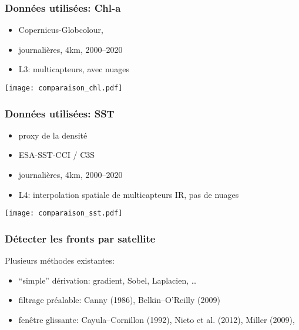\documentclass[11pt, french, aspectratio=32]{beamer}
\begin{document}

\begin{frame}
  \frametitle{Données utilisées: Chl-a}

  \begin{block}{}
    \begin{itemize}
      \item Copernicus-Globcolour,
      \item journalières, 4km, 2000--2020
      \item L3: multicapteurs, avec nuages
    \end{itemize}
  \end{block}

  \vfill

  {\footnotesize\textit{\raisebox{2em}{22 avril 2007}}}
  \texttt{[image: comparaison\_chl.pdf]}%
\end{frame}


\begin{frame}
  \frametitle{Données utilisées: SST}

  \begin{block}{}
    \begin{itemize}
      \item proxy de la densité
      \item ESA-SST-CCI / C3S
      \item journalières, 4km, 2000--2020
      \item L4: interpolation spatiale de multicapteurs IR, pas de nuages
    \end{itemize}
  \end{block}

  \vfill

  {\footnotesize\textit{\raisebox{2em}{22 avril 2007}}}
  \texttt{[image: comparaison\_sst.pdf]}%

\end{frame}


\begin{frame}
  \frametitle{Détecter les fronts par satellite}

  \begin{block}{}
    Plusieurs méthodes existantes:
    \begin{itemize}
            \setlength{\itemsep}{1.2em}
      \item “simple” dérivation: gradient, Sobel, Laplacien, \dots
      \item filtrage préalable: Canny (1986), Belkin--O'Reilly (2009)
      \item fenêtre glissante: Cayula--Cornillon (1992), Nieto et al. (2012), Miller (2009), 
    \end{itemize}
  \end{block}
\end{frame}
\end{document}
